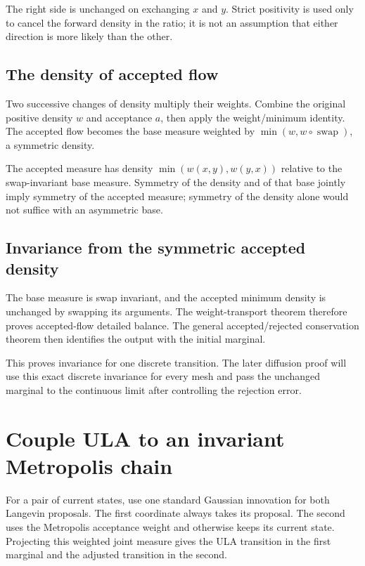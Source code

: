 \documentclass[11pt,a4paper]{article}
\begin{document}
The right side is unchanged on exchanging \(x\) and \(y\). Strict positivity is used only to cancel the forward density in the ratio; it is not an assumption that either direction is more likely than the other.


\subsection{\texorpdfstring{The density of accepted flow}{The density of accepted flow}}


Two successive changes of density multiply their weights. Combine the original positive density \(w\) and acceptance \(a\), then apply the weight/\allowbreak{}minimum identity. The accepted flow becomes the base measure weighted by \(\min(w,w\circ\operatorname{swap})\), a symmetric density.



The accepted measure has density \(\min(w(x,y),w(y,x))\) relative to the swap-invariant base measure. Symmetry of the density and of that base jointly imply symmetry of the accepted measure; symmetry of the density alone would not suffice with an asymmetric base.


\subsection{\texorpdfstring{Invariance from the symmetric accepted density}{Invariance from the symmetric accepted density}}


The base measure is swap invariant, and the accepted minimum density is unchanged by swapping its arguments. The weight-transport theorem therefore proves accepted-flow detailed balance. The general accepted/\allowbreak{}rejected conservation theorem then identifies the output with the initial marginal.



This proves invariance for one discrete transition. The later diffusion proof will use this exact discrete invariance for every mesh and pass the unchanged marginal to the continuous limit after controlling the rejection error.


\section{\texorpdfstring{Couple ULA to an invariant Metropolis chain}{Couple ULA to an invariant Metropolis chain}}


For a pair of current states, use one standard Gaussian innovation for both Langevin proposals. The first coordinate always takes its proposal. The second uses the Metropolis acceptance weight and otherwise keeps its current state. Projecting this weighted joint measure gives the ULA transition in the first marginal and the adjusted transition in the second.
\end{document}
